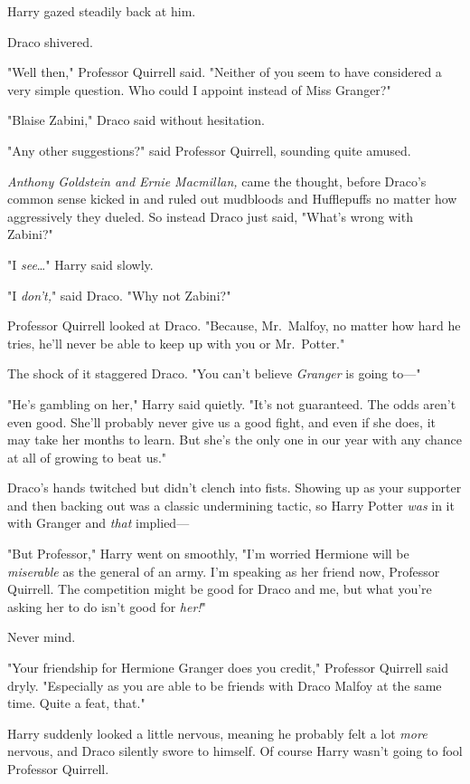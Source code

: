 Harry gazed steadily back at him.

Draco shivered.

"Well then," Professor Quirrell said. "Neither of you seem to have considered a
very simple question. Who could I appoint instead of Miss Granger?"

"Blaise Zabini," Draco said without hesitation.

"Any other suggestions?" said Professor Quirrell, sounding quite amused.

\emph{Anthony Goldstein and Ernie Macmillan,} came the thought, before Draco's
common sense kicked in and ruled out mudbloods and Hufflepuffs no matter how
aggressively they dueled. So instead Draco just said, "What's wrong with
Zabini?"

"I \emph{see}{\ldots}" Harry said slowly.

"I \emph{don't,}" said Draco. "Why not Zabini?"

Professor Quirrell looked at Draco. "Because, Mr.~Malfoy, no matter how hard he
tries, he'll never be able to keep up with you or Mr.~Potter."

The shock of it staggered Draco. "You can't believe \emph{Granger} is going
to---"

"He's gambling on her," Harry said quietly. "It's not guaranteed. The odds
aren't even good. She'll probably never give us a good fight, and even if she
does, it may take her months to learn. But she's the only one in our year with
any chance at all of growing to beat us."

Draco's hands twitched but didn't clench into fists. Showing up as your
supporter and then backing out was a classic undermining tactic, so Harry
Potter \emph{was} in it with Granger and \emph{that} implied---

"But Professor," Harry went on smoothly, "I'm worried Hermione will be
\emph{miserable} as the general of an army. I'm speaking as her friend now,
Professor Quirrell. The competition might be good for Draco and me, but what
you're asking her to do isn't good for \emph{her!}"

Never mind.

"Your friendship for Hermione Granger does you credit," Professor Quirrell said
dryly. "Especially as you are able to be friends with Draco Malfoy at the same
time. Quite a feat, that."

Harry suddenly looked a little nervous, meaning he probably felt a lot
\emph{more} nervous, and Draco silently swore to himself. Of course Harry
wasn't going to fool Professor Quirrell.

